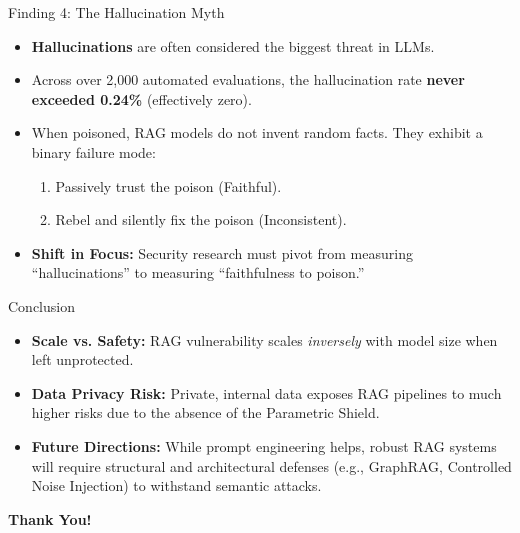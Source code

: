 \documentclass[aspectratio=169]{beamer}
\begin{document}
\begin{frame}{Finding 4: The Hallucination Myth}
  \begin{itemize}
    \item \textbf{Hallucinations} are often considered the biggest threat in LLMs.
    \vspace{0.2cm}
    \item Across over 2,000 automated evaluations, the hallucination rate \textbf{never exceeded 0.24\%} (effectively zero).
    \vspace{0.2cm}
    \item When poisoned, RAG models do not invent random facts. They exhibit a binary failure mode:
    \begin{enumerate}
      \item Passively trust the poison (Faithful).
      \item Rebel and silently fix the poison (Inconsistent).
    \end{enumerate}
    \vspace{0.2cm}
    \item \textbf{Shift in Focus:} Security research must pivot from measuring ``hallucinations'' to measuring ``faithfulness to poison.''
  \end{itemize}
\end{frame}

\begin{frame}{Conclusion}
  \begin{itemize}
    \item \textbf{Scale vs. Safety:} RAG vulnerability scales \textit{inversely} with model size when left unprotected.
    \vspace{0.3cm}
    \item \textbf{Data Privacy Risk:} Private, internal data exposes RAG pipelines to much higher risks due to the absence of the Parametric Shield.
    \vspace{0.3cm}
    \item \textbf{Future Directions:} While prompt engineering helps, robust RAG systems will require structural and architectural defenses (e.g., GraphRAG, Controlled Noise Injection) to withstand semantic attacks.
  \end{itemize}
  \vspace{0.5cm}
  \begin{center}
    \Large \textbf{Thank You!}
  \end{center}
\end{frame}
\end{document}
